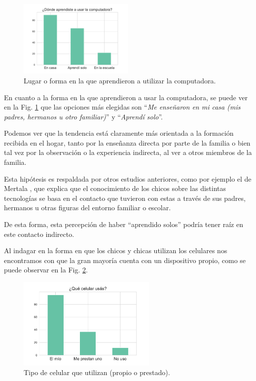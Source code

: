 \begin{figure}[h]
    \centering
    \includegraphics[width=0.50\textwidth]{images_analisis/5.pdf}
    \caption{Lugar o forma en la que aprendieron a utilizar la computadora.}
    \label{fig:analisis5}
\end{figure}

En cuanto a la forma en la que aprendieron a usar la computadora, se puede ver en la Fig. \ref{fig:analisis5} que las opciones más elegidas son ``\textit{Me enseñaron en mi casa (mis padres, hermanos u otro familiar)}'' y ``\textit{Aprendí solo}''.

Podemos ver que la tendencia está claramente más orientada a la formación recibida en el hogar, tanto por la enseñanza directa por parte de la familia o bien tal vez por la observación o la experiencia indirecta, al ver a otros miembros de la familia.

Esta hipótesis es respaldada por otros estudios anteriores, como por ejemplo el de Mertala \cite{mertala}, que explica que el conocimiento de los chicos sobre las distintas tecnologías se basa en el contacto que tuvieron con estas a través de sus padres, hermanos u otras figuras del entorno familiar o escolar.

De esta forma, esta percepción de haber ``aprendido solos'' podría tener raíz en este contacto indirecto.

Al indagar en la forma en que los chicos y chicas utilizan los celulares nos encontramos con que la gran mayoría cuenta con un dispositivo propio, como se puede observar en la Fig. \ref{fig:analisis6}.

\begin{figure}[h]
    \centering
    \includegraphics[width=0.6\textwidth]{images_analisis/6.pdf}
    \caption{Tipo de celular que utilizan (propio o prestado).}
    \label{fig:analisis6}
\end{figure}


